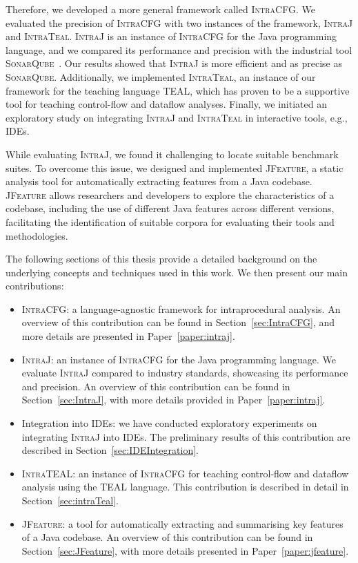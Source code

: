 Therefore, we developed a more general framework called \textsc{IntraCFG}.
We evaluated the precision of \textsc{IntraCFG} with two instances of the framework, 
\textsc{IntraJ} and \textsc{IntraTeal}. 
\textsc{IntraJ} is an instance of \textsc{IntraCFG} for the Java programming language,
and we compared its performance and precision with the industrial tool \textsc{SonarQube}~\cite{sonarqube}. Our results 
showed that \textsc{IntraJ} is more efficient and as precise as \textsc{SonarQube}. 
Additionally, we implemented \textsc{IntraTeal}, an instance of our framework for the teaching 
language TEAL, which has proven to be a supportive tool for teaching control-flow and 
dataflow analyses. Finally, we initiated an exploratory study on integrating
\textsc{IntraJ} and \textsc{IntraTeal} in interactive tools, e.g., IDEs.

While evaluating \textsc{IntraJ}, we found it challenging to locate suitable 
benchmark suites. To overcome this issue, we designed and implemented \textsc{JFeature}, 
a static analysis tool for automatically extracting features from a Java codebase.
\textsc{JFeature} allows researchers and developers to explore the characteristics of a 
codebase, including the use of different Java features across different 
versions, facilitating the identification of suitable corpora for evaluating
their tools and methodologies.

The following sections of this thesis provide a detailed background on the 
underlying concepts and techniques used in this work. We then present our main contributions:
\begin{itemize}
	\item \textsc{IntraCFG}: a language-agnostic framework for intraprocedural analysis.
	 An overview of this contribution can be found in Section~\ref{sec:IntraCFG}, and more details are presented in Paper~\ref{paper:intraj}.
	\item \textsc{IntraJ}: an instance of \textsc{IntraCFG} for the Java programming language. 
	We evaluate \textsc{IntraJ} compared to industry standards, showcasing its 
	performance and precision. An overview of this contribution can be found in Section~\ref{sec:IntraJ},
	with more details provided in Paper~\ref{paper:intraj}.
	\item Integration into IDEs: we have conducted exploratory experiments on integrating
	\textsc{IntraJ} into IDEs. The preliminary results of this contribution are described in Section~\ref{sec:IDEIntegration}.
	\item \textsc{IntraTEAL}: an instance of \textsc{IntraCFG} for teaching control-flow and  dataflow analysis using the TEAL language.
	This contribution is described in detail in Section~\ref{sec:intraTeal}.
	\item \textsc{JFeature}: a tool for automatically extracting and summarising key 
	features of a Java codebase. An overview of this contribution can be found 
	in Section~\ref{sec:JFeature}, with more details presented in Paper~\ref{paper:jfeature}.

\end{itemize}

